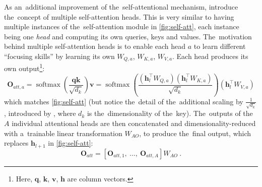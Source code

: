 \documentclass[bsc,frontabs,singlespacing,parskip,deptreport]{infthesis}
\DeclareMathOperator{\softmax}{softmax}
\begin{document}
{{{      %
      As an~additional improvement of the~self-attentional mechanism, \citeauthor{Vaswani_2017} introduce the~concept of multiple self-attention heads. This is very similar to having multiple instances of the~self-attention module in \autoref{fig:self-att}, each instance being one \textit{head} and computing its own queries, keys and values. The~motivation behind multiple self-attention heads is to enable each head $a$ to learn different ``focusing skills'' by learning its own $W_{Q,a}$, $W_{K,a}$, $W_{V,a}$. Each head produces its own output\footnote{Here, $\bm{q}$, $\bm{k}$, $\bm{v}$, $\bm{h}$ are column vectors.}:
      \begin{equation}
      \bm{O}_{att,a} = \softmax(\frac{\bm{q}\bm{k}}{\sqrt{d_k}})\bm{v} = \softmax(\frac{(\bm{h}_l^\top{W_{Q,a}})(\bm{h}_l^\top{W_{K,a}})}{\sqrt{d_k}})(\bm{h}_l^\top{W_{V,a}})
      \end{equation}
      which matches \autoref{fig:self-att} (but notice the~detail of the~additional scaling by $\frac{1}{\sqrt{d_k}}$, introduced by \citeauthor{Vaswani_2017}, where $d_k$ is the~dimensionality of the~key).
      The~outputs of the~$A$ individual attentional heads are then concatenated and dimensionality-reduced with a~trainable linear transformation $W_{AO}$, to produce the~final output, which replaces $\bm{h}_{l+1}$ in \autoref{fig:self-att}:
      \begin{equation}
      \bm{O}_{att} = [\bm{O}_{att, 1},\ \ldots,\ \bm{O}_{att, A}]W_{AO}\ .
      \end{equation}
      
}}}
\end{document}
